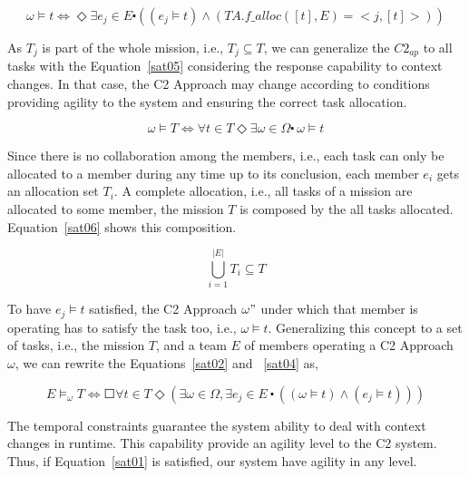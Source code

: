 \begin{center}
\begin{equation}
\label{sat05}
\omega \models t \Longleftrightarrow   \Diamond \exists e_j \in E \centerdot ((e_j \models t) \land (TA.f\_alloc([t],E)=<j,[t]>))
\end{equation}
\end{center}

As $T_j$ is part of the whole mission, i.e., $T_j \subseteq T$, we can generalize the $C2_{ap}$ to all tasks with the Equation~\ref{sat05} considering the response capability to context changes. In that case, the C2 Approach may change according to conditions providing agility to the system and ensuring the correct task allocation.

\begin{center}
\begin{equation}
\label{sat05}
\omega \models T \Longleftrightarrow \forall t \in T \Diamond \exists \omega \in \Omega \centerdot \ \omega \models t 
\end{equation}
\end{center}

Since there is no collaboration among the members, i.e., each task can only be allocated to a member during any time up to its conclusion, each member $e_i$ gets an allocation set $T_i$. A complete allocation, i.e., all tasks of a mission are allocated to some member, the mission $T$ is composed by the all tasks allocated. Equation~\ref{sat06} shows this composition.

\begin{center}
\begin{equation}
\label{sat06}
\bigcup\limits ^{|E|}_{i=1} T_i \subseteq T
\end{equation}
\end{center}

To have $e_j \models t$ satisfied, the C2 Approach $\omega"$ under which that member is operating has to satisfy the task too, i.e., $\omega \models t$. Generalizing this concept to a set of tasks, i.e., the mission $T$, and a team $E$ of members operating a C2 Approach $\omega$, we can rewrite the Equations~\ref{sat02} and ~\ref{sat04} as,

\begin{center}
\begin{equation}
\label{sat01}
E \models_\omega T \Longleftrightarrow \Square \forall t \in T \Diamond (\exists \omega \in \Omega, \exists e_j \in E \ \centerdot \ ((\omega \models t) \land (e_j \models t)))
\end{equation}
\end{center}

The temporal constraints guarantee the system ability to deal with context changes in runtime. This capability provide an agility level to the C2 system. Thus, if Equation~\ref{sat01} is satisfied, our system have agility in any level.

